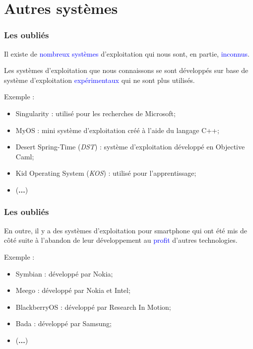 \documentclass[aspectratio=169]{beamer}
\begin{document}
\section{Autres systèmes}
\begin{frame}
  \frametitle{Les oubliés}
  Il existe de \textcolor{blue}{nombreux systèmes} d'exploitation qui nous
  sont, en partie, \textcolor{blue}{inconnus}.

  \hspace{0.5cm}

  Les systèmes d'exploitation que nous connaissons se sont développés sur base
  de système d'exploitation \textcolor{blue}{expérimentaux} qui ne sont plus utilisés.

  \hspace{0.5cm}

  Exemple :

  \begin{itemize}
  \item Singularity : utilisé pour les recherches de Microsoft;

  \item MyOS : mini système d'exploitation créé à l'aide du langage C++;

  \item Desert Spring-Time (\textit{DST}) : système d'exploitation développé en Objective Caml;

  \item Kid Operating System (\textit{KOS}) : utilisé pour l'apprentissage;

    \item (\textbf{...})
    \end{itemize}
\end{frame}

\begin{frame}
  \frametitle{Les oubliés}
  En outre, il y a des systèmes d'exploitation pour smartphone qui ont été mis
  de côté suite à l'abandon de leur développement au \textcolor{blue}{profit}
  d'autres technologies.

  \hspace{0.5cm}

  Exemple :

  \begin{itemize}
  \item Symbian : développé par Nokia;

  \item Meego : développé par Nokia et Intel;

  \item BlackberryOS : développé par Research In Motion;

  \item Bada : développé par Samsung;

  \item (\textbf{...})
  \end{itemize}
\end{frame}
\end{document}
